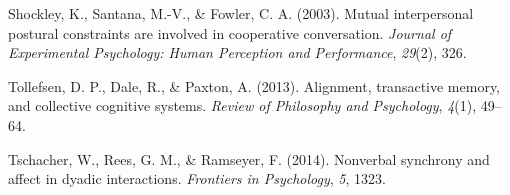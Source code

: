 \documentclass[10pt, letterpaper]{article}
\begin{document}
\hypertarget{ref-shockley2003mutual}{}
Shockley, K., Santana, M.-V., \& Fowler, C. A. (2003). Mutual
interpersonal postural constraints are involved in cooperative
conversation. \emph{Journal of Experimental Psychology: Human Perception
and Performance}, \emph{29}(2), 326.

\hypertarget{ref-tollefsen2013alignment}{}
Tollefsen, D. P., Dale, R., \& Paxton, A. (2013). Alignment, transactive
memory, and collective cognitive systems. \emph{Review of Philosophy and
Psychology}, \emph{4}(1), 49--64.

\hypertarget{ref-tschacher2014nonverbal}{}
Tschacher, W., Rees, G. M., \& Ramseyer, F. (2014). Nonverbal synchrony
and affect in dyadic interactions. \emph{Frontiers in Psychology},
\emph{5}, 1323.
\end{document}
